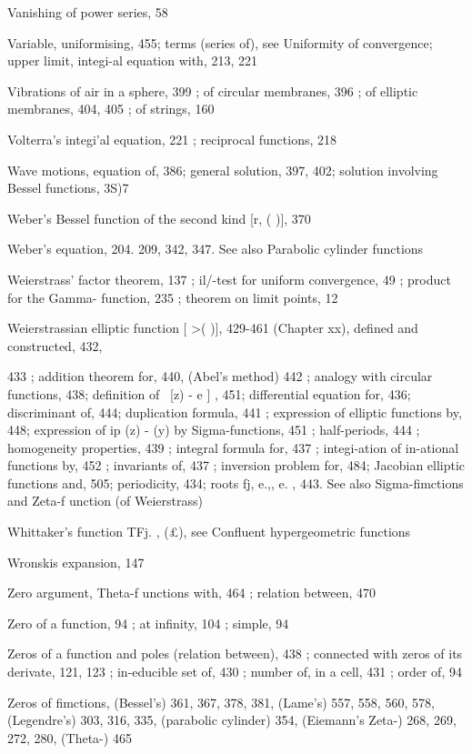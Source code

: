 Vanishing of power series, 58

Variable, uniformising, 455; terms (series of), see Uniformity of convergence; upper limit,
integi-al equation with, 213, 221

Vibrations of air in a sphere, 399 ; of circular membranes, 396 ; of elliptic membranes, 404, 405 ;
of strings, 160

Volterra's integi'al equation, 221 ; reciprocal functions, 218

Wave motions, equation of, 386; general solution, 397, 402; solution involving Bessel functions,
3S)7

Weber's Bessel function of the second kind [r, ( )], 370

Weber's equation, 204. 209, 342, 347. See also Parabolic cylinder functions

Weierstrass' factor theorem, 137 ; il/-test for uniform convergence, 49 ; product for the Gamma-
function, 235 ; theorem on limit points, 12

Weierstrassian elliptic function [  >( )], 429-461 (Chapter xx), defined and constructed, 432,

433 ; addition theorem for, 440, (Abel's method) 442 ; analogy with circular functions,
438; definition of \   [z) - e ] , 451; differential equation for, 436; discriminant of, 444;
duplication formula, 441 ; expression of elliptic functions by, 448; expression of ip (z) -   (y)
by Sigma-functions, 451 ; half-periods, 444 ; homogeneity properties, 439 ; integral formula
for, 437 ; integi-ation of in-ational functions by, 452 ; invariants of, 437 ; inversion problem
for, 484; Jacobian elliptic functions and, 505; periodicity, 434; roots fj, e.,, e. , 443. See
also Sigma-fimctions and Zeta-f unction (of Weierstrass)

Whittaker's function TFj. , (£), see Confluent hypergeometric functions

Wronskis expansion, 147

Zero argument, Theta-f unctions with, 464 ; relation between, 470

Zero of a function, 94 ; at infinity, 104 ; simple, 94

Zeros of a function and poles (relation between), 438 ; connected with zeros of its derivate, 121,
123 ; in-educible set of, 430 ; number of, in a cell, 431 ; order of, 94

Zeros of fimctions, (Bessel's) 361, 367, 378, 381, (Lame's) 557, 558, 560, 578, (Legendre's) 303,
316, 335, (parabolic cylinder) 354, (Eiemann's Zeta-) 268, 269, 272, 280, (Theta-) 465

